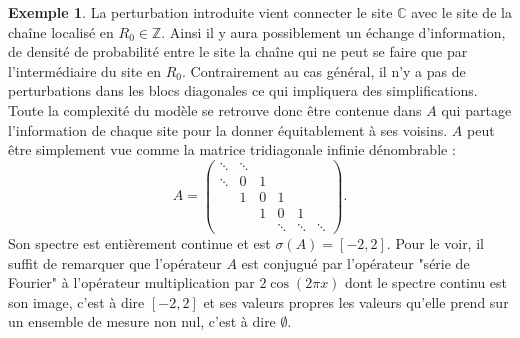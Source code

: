 \documentclass[12pt,openany,a4paper, titlepage]{article}
\newcommand{\C}{\mathbb{C}}
\newcommand{\Z}{\mathbb{Z}}
\theoremstyle{definition}
\theoremstyle{definition}
\theoremstyle{definition}
\newtheorem{ex}{Exemple}
\theoremstyle{definition}
\theoremstyle{definition}
\theoremstyle{definition}
\begin{document}
\begin{ex}
La perturbation introduite vient connecter le site $\C$ avec le site de la chaîne localisé en $R_0\in\Z$. Ainsi il y aura possiblement un échange d'information, de densité de probabilité entre le site la chaîne qui ne peut se faire que par l'intermédiaire du site en $R_0$. Contrairement au cas général, il n'y a pas de perturbations dans les blocs diagonales ce qui impliquera des simplifications. 
Toute la complexité du modèle se retrouve donc être contenue dans $A$ qui partage l'information de chaque site pour la donner équitablement à ses voisins. $A$ peut être simplement vue comme la matrice tridiagonale infinie dénombrable :
\begin{equation}
   A = \begin{pmatrix}
\ddots & \ddots   \\
 \ddots & 0 & 1  \\
   & 1 & 0 & 1  \\
   &  & 1 & 0&  1& \\
   &  &   & \ddots & \ddots& \ddots 
\end{pmatrix}.
\end{equation}
Son spectre est entièrement continue et est $\sigma(A) = [-2,2]$. Pour le voir, il suffit de remarquer que l'opérateur $A$ est conjugué par l'opérateur "série de Fourier" à l'opérateur multiplication par $2\cos(2\pi x)$ dont le spectre continu est son image, c'est à dire $[-2,2]$ et ses valeurs propres les valeurs qu'elle prend sur un ensemble de mesure non nul, c'est à dire $\emptyset$.



\begin{figure}[h]
\centering
\begin{tikzpicture}[x=0.75pt,y=0.75pt,yscale=-1,xscale=1]


\end{tikzpicture}
\end{figure}
\end{ex}
\end{document}
